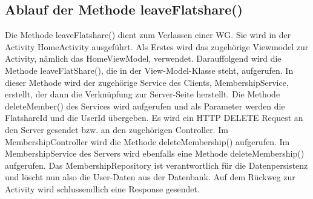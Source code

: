 \subsection{Ablauf der Methode leaveFlatshare()}

Die Methode leaveFlatshare() dient zum Verlassen einer WG. Sie wird in der Activity HomeActivity ausgeführt. Als Erstes wird das zugehörige Viewmodel zur Activity, nämlich das HomeViewModel, verwendet. Darauffolgend wird die Methode leaveFlatShare(), die in der View-Model-Klasse steht, aufgerufen. In dieser Methode wird der zugehörige Service des Clients, MembershipService, erstellt, der dann die Verknüpfung zur Server-Seite herstellt. Die Methode deleteMember() des Services wird aufgerufen und als Parameter werden die FlatshareId und die UserId übergeben. Es wird ein HTTP DELETE Request an den Server gesendet bzw. an den zugehörigen Controller. Im MembershipController wird die Methode deleteMembership() aufgerufen. Im MembershipService des Servers wird ebenfalls eine Methode deleteMembership() aufgerufen. Das MembershipRepository ist verantwortlich für die Datenpersistenz und löscht nun also die User-Daten aus der Datenbank. Auf dem Rückweg zur Activity wird schlussendlich eine Response gesendet.